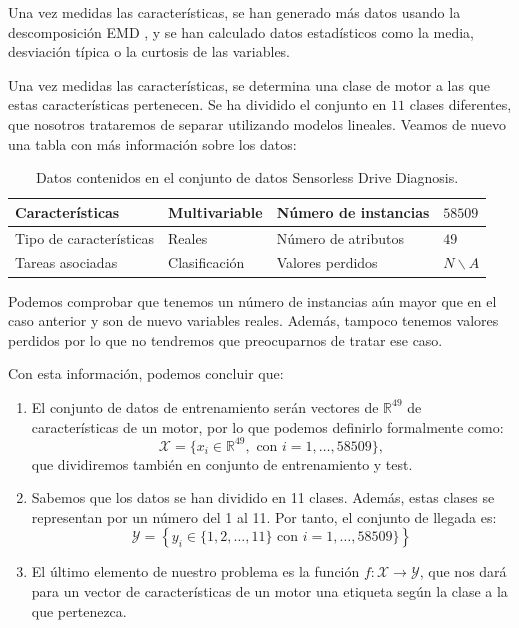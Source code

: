 \documentclass[a4paper, 20pt]{article}
\newcommand{\R}{\mathbb R}
\begin{document}
Una vez medidas las características, se han generado más datos usando la descomposición EMD \cite{noauthor_hilberthuang_2021}, y se han calculado datos estadísticos como la media, desviación típica o la curtosis de las variables.

Una vez medidas las características, se determina una clase de motor a las que estas características pertenecen. Se ha dividido el conjunto en $11$ clases diferentes, que nosotros trataremos de separar utilizando modelos lineales. Veamos de nuevo una tabla con más información sobre los datos:


\begin{table}[h]
  \centering
  \begin{tabular}{|l|l|l|l|}
    \hline
    Características         & Multivariable & Número de instancias & $58509$ \\ \hline
    Tipo de características & Reales        & Número de atributos  & $49$    \\ \hline
    Tareas asociadas        & Clasificación     & Valores perdidos     & $N\backslash A$   \\ \hline
  \end{tabular}
  \caption{Datos contenidos en el conjunto de datos Sensorless Drive Diagnosis.}
\end{table}

Podemos comprobar que tenemos un número de instancias aún mayor que en el caso anterior y son de nuevo variables reales. Además, tampoco tenemos valores perdidos por lo que no tendremos que preocuparnos de tratar ese caso. 

Con esta información, podemos concluir que:

\begin{enumerate}
\item El conjunto de datos de entrenamiento serán vectores de $\R^{49}$ de características de un motor, por lo que podemos definirlo formalmente como:
$$
\mathcal X = \{ x_i \in \R^{49}, \text{ con } i= 1, \dots, 58509\},
$$
que dividiremos también en conjunto de entrenamiento y test.

\item Sabemos que los datos se han dividido en 11 clases. Además, estas clases se representan por un número del 1 al 11. Por tanto, el conjunto de llegada es:
$$
\mathcal Y = \left\{ y_i \in \{1,2,\dots,11\} \text{ con } i = 1,\dots, 58509\}\right\}
$$
\item El último elemento de nuestro problema es la función $f: \mathcal X \to \mathcal Y$, que nos dará para un vector de características de un motor una etiqueta según la clase a la que pertenezca.
\end{enumerate}
\end{document}
